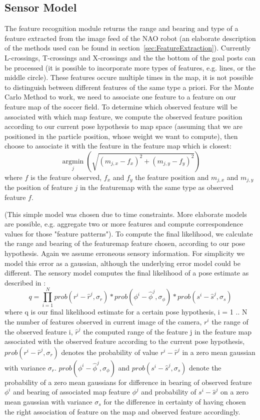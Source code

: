 \documentclass[	DIV=calc,%
							paper=a4,%
							fontsize=9pt,%
							twocolumn]{scrartcl}	 					%
\begin{document}
\subsection{Sensor Model}
\label{sec:SensorModel}
The feature recognition module returns the range and bearing and type of a feature extracted from the image feed of the NAO robot (an elaborate description of the methods used can be found in section~\ref{sec:FeatureExtraction}). Currently L-crossings, T-crossings and X-crossings and the the bottom of the goal posts can be processed (it is possible to incorporate more types of features, e.g. lines, or the middle circle). These features occure multiple times in the map, it is not possible to distinguish between different features of the same type a priori. For the Monte Carlo Method to work, we need to associate one feature to a feature on our feature map of the soccer field. To determine which observed feature will be associated with which map feature, we compute the observed feature position according to our current pose hypothesis to map space (assuming that we are positioned in the particle position, whose weight we want to compute), then choose to associate it with the feature in the feature map which is closest:
\[\underset{j}{\operatorname{argmin}}  (\sqrt{(m_{j,x} - f_x)^2 + (m_{j,y} - f_y)^2})   \] 
where $f$ is the feature observed, $f_x$ and $f_y$ the feature position and $m_{j,x}$ and $m_{j,y}$ the position of feature $j$ in the featuremap with the same type as observed feature $f$. 

(This simple model was chosen due to time constraints. More elaborate models are possible, e.g. aggregate two or more features and compute correspondence values for those "feature patterns"). To compute the final likelihood, we calculate the range and bearing of the featuremap feature chosen, according to our pose hypothesis. Again we assume erroneous sensory information. For simplicity we model this error as a gaussian, although the underlying error model could be different. 
The sensory model computes the final likelihood of a pose estimate as described in \cite{ProbabilisticRobotics}:
\[ q = \prod\limits_{i=1}^{N}{ prob(r^i  - \hat{r}^j,\sigma_r) * prob(\phi^i - \hat{\phi}^j ,\sigma_{\phi}) * prob(s^i - \hat{s}^j ,\sigma_s)  }  \]
where q is our final likelihood estimate for a certain pose hypothesis, i = 1 .. N the number of features observed in current image of the camera, $ r^i $ the range of the observed feature i, $\hat{r}^j$ the computed range of the feature j in the feature map associated with the observed feature according to the current pose hypothesis, $prob(r^i - \hat{r}^j,\sigma_r)$ denotes the probability of value $r^i - \hat{r}^j$ in a zero mean gaussian with variance $\sigma_r$. $prob(\phi^i - \hat{\phi}^j ,\sigma_{\phi})$ and  $prob(s^i - \hat{s}^j ,\sigma_s)$ denote the probability of a zero mean gaussians for difference in bearing of observed feature $\phi^i$ and bearing of associated map feature $\phi^j$ and probability of $s^i - \hat{s}^j$ on a zero mean gaussian with variance $\sigma_s$ for the difference in certainty of having chosen the right association of feature on the map and observed feature accordingly.
\end{document}
